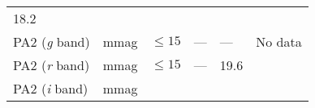 \begin{longtable}[]{@{}llllll@{}}
\begin{minipage}[t]{0.12\columnwidth}
18.2\strut
\end{minipage} & \begin{minipage}[t]{0.17\columnwidth}\raggedright\strut
\strut
\end{minipage}\tabularnewline
\begin{minipage}[t]{0.14\columnwidth}\raggedright\strut
PA2 (\emph{g} band)\strut
\end{minipage} & \begin{minipage}[t]{0.06\columnwidth}\raggedright\strut
mmag\strut
\end{minipage} & \begin{minipage}[t]{0.17\columnwidth}\raggedright\strut
\(\leq 15\)\strut
\end{minipage} & \begin{minipage}[t]{0.17\columnwidth}\raggedright\strut
---\strut
\end{minipage} & \begin{minipage}[t]{0.12\columnwidth}\raggedright\strut
---\strut
\end{minipage} & \begin{minipage}[t]{0.17\columnwidth}\raggedright\strut
No data\strut
\end{minipage}\tabularnewline
\begin{minipage}[t]{0.14\columnwidth}\raggedright\strut
PA2 (\emph{r} band)\strut
\end{minipage} & \begin{minipage}[t]{0.06\columnwidth}\raggedright\strut
mmag\strut
\end{minipage} & \begin{minipage}[t]{0.17\columnwidth}\raggedright\strut
\(\leq 15\)\strut
\end{minipage} & \begin{minipage}[t]{0.17\columnwidth}\raggedright\strut
---\strut
\end{minipage} & \begin{minipage}[t]{0.12\columnwidth}\raggedright\strut
19.6\strut
\end{minipage} & \begin{minipage}[t]{0.17\columnwidth}\raggedright\strut
\strut
\end{minipage}\tabularnewline
\begin{minipage}[t]{0.14\columnwidth}\raggedright\strut
PA2 (\emph{i} band)\strut
\end{minipage} & \begin{minipage}[t]{0.06\columnwidth}\raggedright\strut
mmag\strut
\end{minipage} & \begin{minipage}[t]{0.17\columnwidth}\raggedright\strut

\end{minipage}
\end{longtable}

